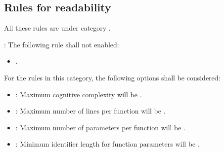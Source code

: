 \subsection{Rules for readability}

All these rules are under category
.

: The following rule shall not enabled:
\begin{itemize}

\item {}.

\end{itemize}

For the rules in this category, the following options shall be considered:

\begin{itemize}

\item {}:
Maximum cognitive complexity will be .

\item {}:
Maximum number of lines per function will be .

\item {}:
Maximum number of parameters per function will be .

\item {}:
Minimum identifier length for function parameters will be .

\end{itemize}
